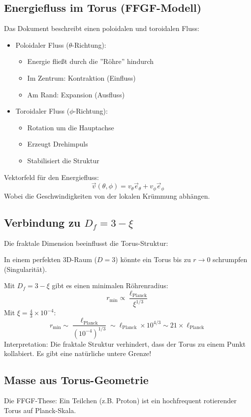 \documentclass[12pt,a4paper]{article}
\begin{document}
	\subsection{Energiefluss im Torus (FFGF-Modell)}
	Das Dokument beschreibt einen poloidalen und toroidalen Fluss:
	\begin{itemize}
		\item Poloidaler Fluss (\( \theta \)-Richtung):
		\begin{itemize}
			\item Energie fließt durch die ''Röhre'' hindurch
			\item Im Zentrum: Kontraktion (Einfluss)
			\item Am Rand: Expansion (Ausfluss)
		\end{itemize}
		\item Toroidaler Fluss (\( \phi \)-Richtung):
		\begin{itemize}
			\item Rotation um die Hauptachse
			\item Erzeugt Drehimpuls
			\item Stabilisiert die Struktur
		\end{itemize}
	\end{itemize}
	
	Vektorfeld für den Energiefluss:
	\[
	\vec{v}(\theta, \phi) = v_\theta \vec{e}_\theta + v_\phi \vec{e}_\phi
	\]
	Wobei die Geschwindigkeiten von der lokalen Krümmung abhängen.
	
	\subsection{Verbindung zu \( D_f = 3 - \xi \)}
	Die fraktale Dimension beeinflusst die Torus-Struktur:
	
	In einem perfekten 3D-Raum (\( D = 3 \)) könnte ein Torus bis zu \( r \to 0 \) schrumpfen (Singularität).
	
	Mit \( D_f = 3 - \xi \) gibt es einen minimalen Röhrenradius:
	\[
	r_{\text{min}} \propto \frac{\ell_{\text{Planck}}}{\xi^{1/3}}
	\]
	Mit \( \xi = \frac{4}{3} \times 10^{-4} \):
	\[
	r_{\text{min}} \sim \frac{\ell_{\text{Planck}}}{(10^{-4})^{1/3}} \sim \ell_{\text{Planck}} \times 10^{4/3} \sim 21 \times \ell_{\text{Planck}}
	\]
	Interpretation: Die fraktale Struktur verhindert, dass der Torus zu einem Punkt kollabiert. Es gibt eine natürliche untere Grenze!
	
	\subsection{Masse aus Torus-Geometrie}
	Die FFGF-These: Ein Teilchen (z.B. Proton) ist ein hochfrequent rotierender Torus auf Planck-Skala.
	
\end{document}
